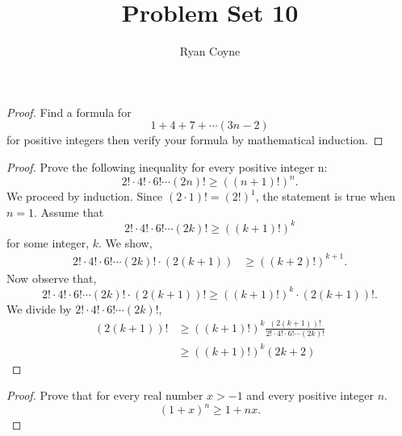 \documentclass[12pt]{article}
\begin{document}
    \title{Problem Set 10}
    \author{Ryan Coyne}
    \maketitle

    \noindent\begin{proof}{Find a formula for \begin{equation*}
        1+4+7+ \cdots (3n-2)
    \end{equation*}
    for positive integers then verify your formula by mathematical induction.}

    \end{proof}
    \begin{proof}{Prove the following inequality for every positive integer n:\begin{equation*}
        2!\cdot4!\cdot6!\cdots(2n)!\geq((n+1)!)^n.
    \end{equation*}}
        We proceed by induction. Since \((2\cdot1)!=(2!)^1\), the statement is true when \(n=1\). Assume that
        \begin{equation*}
            2!\cdot4!\cdot6!\cdots(2k)!\geq((k+1)!)^k
        \end{equation*}
        for some integer, \(k\). We show,
        \begin{equation*}
            \begin{split}
                2!\cdot4!\cdot6!\cdots(2k)!\cdot(2(k+1))&\geq((k+2)!)^{k+1}.
            \end{split}
        \end{equation*}
        Now observe that,
        \begin{equation*}
            2!\cdot4!\cdot6!\cdots(2k)!\cdot(2(k+1))!\geq((k+1)!)^k\cdot(2(k+1))!.
        \end{equation*}
        We divide by \(2!\cdot4!\cdot6!\cdots(2k)!\),
        \begin{equation*}
            \begin{split}
                (2(k+1))!&\geq((k+1)!)^k\frac{(2(k+1))!}{2!\cdot4!\cdot6!\cdots(2k)!}\\
                &\geq((k+1)!)^k(2k+2)
            \end{split}
        \end{equation*}
    \end{proof}

    \begin{proof}{Prove that for every real number \(x>-1\) and every positive integer \(n\).
        \begin{equation*}
            (1+x)^n\geq 1+nx.
        \end{equation*}}
        
    \end{proof}
\end{document}
